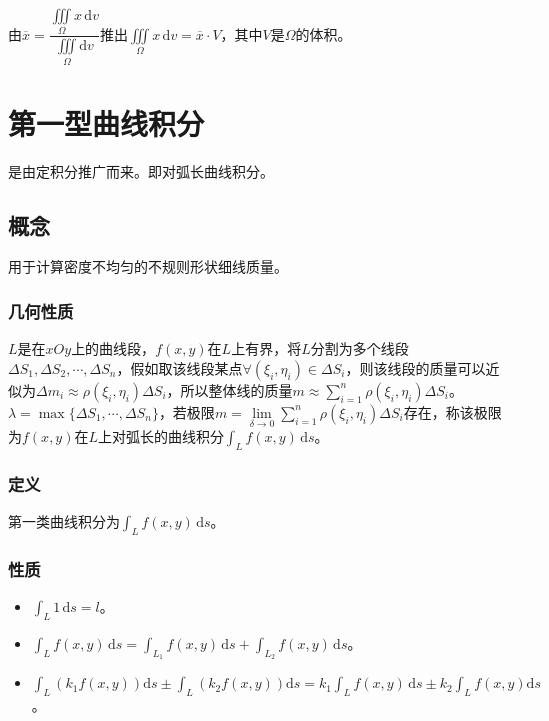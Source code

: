 \documentclass[UTF8, 12pt]{ctexart}
\begin{document}
        由$\overline{x}=\dfrac{\iiint\limits_\Omega x\,\textrm{d}v}{\iiint\limits_\Omega\textrm{d}v}$推出$\iiint\limits_\Omega x\,\textrm{d}v=\overline{x}\cdot V$，其中$V$是$\Omega$的体积。

        \section{第一型曲线积分}

        是由定积分推广而来。即对弧长曲线积分。

        \subsection{概念}

        用于计算密度不均匀的不规则形状细线质量。

        \subsubsection{几何性质}

        $L$是在$xOy$上的曲线段，$f(x,y)$在$L$上有界，将$L$分割为多个线段$\Delta S_1,\Delta S_2,\cdots,\Delta S_n$，假如取该线段某点$\forall(\xi_i,\eta_i)\in\Delta S_i$，则该线段的质量可以近似为$\Delta m_i\approx\rho(\xi_i,\eta_i)\Delta S_i$，所以整体线的质量$m\approx\sum\limits_{i=1}^n\rho(\xi_i,\eta_i)\Delta S_i$。$\lambda=\max\{\Delta S_1,\cdots,\Delta S_n\}$，若极限$m=\lim\limits_{\delta\to0}\sum\limits_{i=1}^n\rho(\xi_i,\eta_i)\Delta S_i$存在，称该极限为$f(x,y)$在$L$上对弧长的曲线积分$\int_Lf(x,y)\,\textrm{d}s$。

        \subsubsection{定义}

        第一类曲线积分为$\int_Lf(x,y)\,\textrm{d}s$。

        \subsubsection{性质}

        \begin{itemize}
            \item $\int_L1\,\textrm{d}s=l$。
            \item $\int_Lf(x,y)\,\textrm{d}s=\int_{L_1}f(x,y)\,\textrm{d}s+\int_{L_2}f(x,y)\,\textrm{d}s$。
            \item $\int_L(k_1f(x,y))\textrm{d}s\pm\int_L(k_2f(x,y))\textrm{d}s=k_1\int_Lf(x,y)\,\textrm{d}s\pm k_2\int_Lf(x,y)\textrm{d}s$。
        \end{itemize}
\end{document}
